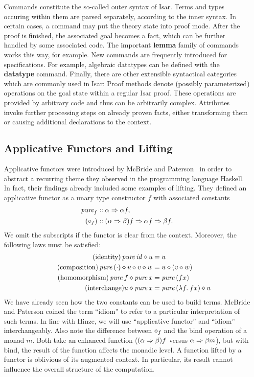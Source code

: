 Commands constitute the so-called outer syntax of Isar.
Terms and types occuring within them are parsed separately, according to the
inner syntax.
In certain cases, a command may put the theory state into proof mode.
After the proof is finished, the associated goal becomes a fact, which can be
further handled by some associated code.
The important \textbf{lemma} family of commands works this way, for example.
New commands are frequently introduced for specifications.
For example, algebraic datatypes can be defined with the \textbf{datatype} command.
Finally, there are other extensible syntactical categories which are commonly
used in Isar:
Proof methods denote (possibly parameterized) operations on the goal state
within a regular Isar proof.
These operations are provided by arbitrary code and thus can be arbitrarily
complex.
Attributes invoke further processing steps on already proven facts, either
transforming them or causing additional declarations to the context.


\subsection{Applicative Functors and Lifting}\label{subsec:applicative}

Applicative functors were introduced by McBride and Paterson~\cite{mcbride08}
in order to abstract a recurring theme they observed in the programming language
Haskell.
In fact, their findings already included some examples of lifting.
They defined an applicative functor as a unary type constructor $f$ with
associated constants
\begin{align*}
	\operatorname{\mathit{pure}}_f &\mathrel{::} \alpha \Rightarrow \alpha f, \\
	(\diamond_f) &\mathrel{::} (\alpha \Rightarrow \beta) f \Rightarrow \alpha f \Rightarrow \beta f.
\end{align*}
We omit the subscripts if the functor is clear from the context.
Moreover, the following laws must be satisfied:
\begin{align*}
	\tag{identity} \operatorname{\mathit{pure}}{\mathit{id}} \diamond u &= u \\
	\tag{composition} \operatorname{\mathit{pure}}{(\cdot)} \diamond u \diamond v \diamond w &= u \diamond (v \diamond w) \\
	\tag{homomorphism} \operatorname{\mathit{pure}}{f} \diamond \operatorname{\mathit{pure}} x &= \operatorname{\mathit{pure}}{(f x)} \\
	\tag{interchange} u \diamond \operatorname{\mathit{pure}}{x} &= \operatorname{\mathit{pure}}{(\lambda f.\>f x)} \diamond u
\end{align*}
We have already seen how the two constants can be used to build terms.
McBride and Paterson coined the term ``idiom'' to refer to a particular
interpretation of such terms.
In line with Hinze, we will use ``applicative functor'' and ``idiom''
interchangeably.
Also note the difference between $\diamond_f$ and the bind operation of a monad $m$.
Both take an enhanced function ($(\alpha \Rightarrow \beta) f$ versus
$\alpha \Rightarrow \beta m$), but with bind, the result of the function affects
the monadic level.
A function lifted by a functor is oblivious of its augmented context.
In particular, its result cannot influence the overall structure of the
computation.

